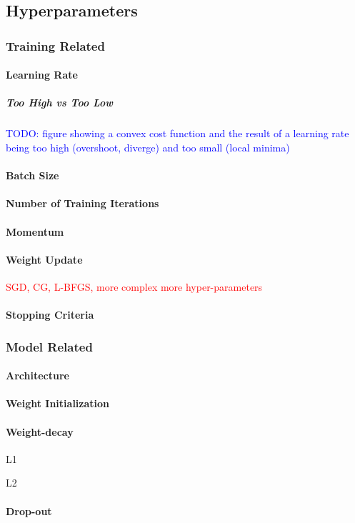 \subsection{Hyperparameters}

\subsubsection{Training Related}

\paragraph{Learning Rate}

\subparagraph{Too High vs Too Low}

\textcolor{blue}{TODO: figure showing a convex cost function and the result of a learning rate being too high (overshoot, diverge) and too small (local minima)}

\paragraph{Batch Size}

\paragraph{Number of Training Iterations}

\paragraph{Momentum}

\paragraph{Weight Update}

\textcolor{red}{SGD, CG, L-BFGS, more complex more hyper-parameters}

\paragraph{Stopping Criteria}

\subsubsection{Model Related}

\paragraph{Architecture}

\paragraph{Weight Initialization}

\paragraph{Weight-decay}

L1

L2

\paragraph{Drop-out}

